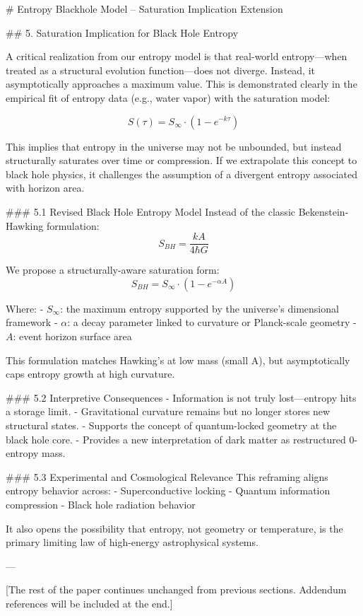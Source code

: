 # Entropy Blackhole Model – Saturation Implication Extension


## 5. Saturation Implication for Black Hole Entropy

A critical realization from our entropy model is that real-world entropy—when treated as a structural evolution function—does not diverge. Instead, it asymptotically approaches a maximum value. This is demonstrated clearly in the empirical fit of entropy data (e.g., water vapor) with the saturation model:

\[
S(\tau) = S_{\infty} \cdot \left(1 - e^{-k \tau} \right)
\]

This implies that entropy in the universe may not be unbounded, but instead structurally saturates over time or compression. If we extrapolate this concept to black hole physics, it challenges the assumption of a divergent entropy associated with horizon area.

### 5.1 Revised Black Hole Entropy Model
Instead of the classic Bekenstein-Hawking formulation:
\[
S_{BH} = \frac{k A}{4 \hbar G}
\]

We propose a structurally-aware saturation form:
\[
S_{BH} = S_{\infty} \cdot \left(1 - e^{-\alpha A} \right)
\]

Where:
- \( S_{\infty} \): the maximum entropy supported by the universe’s dimensional framework
- \( \alpha \): a decay parameter linked to curvature or Planck-scale geometry
- \( A \): event horizon surface area

This formulation matches Hawking’s at low mass (small A), but asymptotically caps entropy growth at high curvature.

### 5.2 Interpretive Consequences
- Information is not truly lost—entropy hits a storage limit.
- Gravitational curvature remains but no longer stores new structural states.
- Supports the concept of quantum-locked geometry at the black hole core.
- Provides a new interpretation of dark matter as restructured 0-entropy mass.

### 5.3 Experimental and Cosmological Relevance
This reframing aligns entropy behavior across:
- Superconductive locking
- Quantum information compression
- Black hole radiation behavior

It also opens the possibility that entropy, not geometry or temperature, is the primary limiting law of high-energy astrophysical systems.

---

[The rest of the paper continues unchanged from previous sections. Addendum references will be included at the end.]


